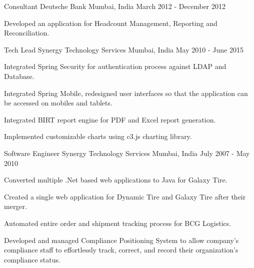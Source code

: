 \begin{cventries}
  \cventry
  {Consultant} %
  {Deutsche Bank} %
  {Mumbai, India} %
  {March 2012 - December 2012} %
  {
  \begin{cvitems} %
    \item {Developed an application for Headcount Management, Reporting and Reconciliation.}
  \end{cvitems}
  }

  \cventry
    {Tech Lead} %
    {Synergy Technology Services} %
    {Mumbai, India} %
    {May 2010 - June 2015} %
    {
      \begin{cvitems} %
        \item {Integrated Spring Security for authentication process against LDAP and Database.}
        \item {Integrated Spring Mobile, redesigned user interfaces so that the application can be accessed on mobiles and tablets.}
        \item {Integrated BIRT report engine for PDF and Excel report generation. }
        \item {Implemented customizable charts using c3.js charting library.}
      \end{cvitems}
    }


  \cventry
    {Software Engineer} %
    {Synergy Technology Services} %
    {Mumbai, India} %
    {July 2007 - May 2010} %
    {
      \begin{cvitems} %
        \item {Converted multiple .Net based web applications to Java for Galaxy Tire.}
        \item {Created a single web application for Dynamic Tire and Galaxy Tire after their merger.}
        \item {Automated entire order and shipment tracking process for BCG Logistics.}
        \item {Developed and managed Compliance Positioning System to allow company’s compliance staff to effortlessly track, correct, and record their organization’s compliance status.}
      \end{cvitems}
    }


\end{cventries}
